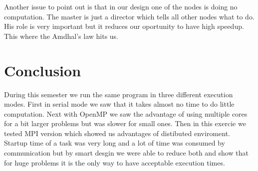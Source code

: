 \documentclass[a4paper,10pt]{article}
\begin{document}
Another issue to point out is that in our design one of the nodes is doing no computation. The master is just a director which tells all other nodes what to do. His role is very important but it reduces our oportunity to have high speedup. This where the Amdhal's law hits us.
\\

\section*{Conclusion}
During this semester we run the same program in three different execution modes. First in serial mode we saw that it takes almost no time to do little computation. Next with OpenMP we saw the advantage of using multiple cores for a bit larger problems but was slower for small ones. Then in this exercie we tested MPI version which showed us advantages of distibuted enviroment. Startup time of a task was very long and a lot of time was consumed by communication but by smart desgin we were able to reduce both and show that for huge problems it is the only way to have acceptable execution times. 
\end{document}
